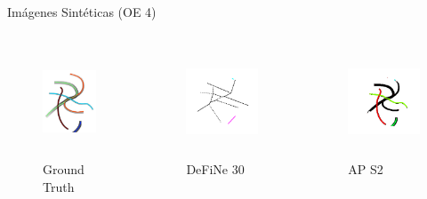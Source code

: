 \begin{frame}{Im\'agenes Sint\'eticas (OE 4)}
    \vspace{-0.6cm}
    \begin{columns}
        \begin{column}{0.31\textwidth}
        
            \begin{figure}
                \centering
                \includegraphics[height=1.3in]{Pictures/define-weighted-4-groundTruth.png}
                \caption{Ground Truth}
            \end{figure}
        \end{column}
        \begin{column}{0.31\textwidth}
            \begin{figure}
                \centering
                \includegraphics[height=1.3in]{Pictures/defineFig1b-DeFiNeExactMatch-30.png}
                \caption{DeFiNe 30\textdegree}
            \end{figure}
        \end{column}
        \begin{column}{0.31\textwidth}
            \begin{figure}
                \centering
                \includegraphics[height=1.3in]{Pictures/define-weighted-4-phil-s3389-v056-exactMatch-antLabeled.png}
                \caption{AP S2}
            \end{figure}
        \end{column}
    \end{columns}


\end{frame}
